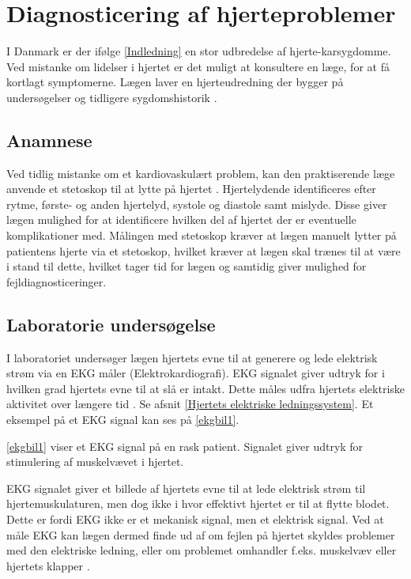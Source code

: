 \section{Diagnosticering af hjerteproblemer}

I Danmark er der ifølge \ref{Indledning}  en stor udbredelse af hjerte-karsygdomme. Ved mistanke om lidelser i hjertet er det muligt at konsultere en læge, for at få kortlagt symptomerne. Lægen laver en hjerteudredning der bygger på undersøgelser og tidligere sygdomshistorik \cite{hjerud}.

\subsection{Anamnese}
Ved tidlig mistanke om et kardiovaskulært problem, kan den praktiserende læge anvende et stetoskop til at lytte på hjertet \cite{subob}. Hjertelydende identificeres efter rytme, første- og anden hjertelyd, systole og diastole samt mislyde. Disse giver lægen mulighed for at identificere hvilken del af hjertet der er eventuelle komplikationer med. Målingen med stetoskop kræver at lægen manuelt lytter på patientens hjerte via et stetoskop, hvilket kræver at lægen skal trænes til at være i stand til dette, hvilket tager tid for lægen og samtidig giver mulighed for fejldiagnosticeringer. 

\subsection{Laboratorie undersøgelse}
I laboratoriet undersøger lægen hjertets evne til at generere og lede elektrisk strøm via en EKG måler (Elektrokardiografi). EKG signalet giver udtryk for i hvilken grad hjertets evne til at slå er intakt. Dette måles udfra hjertets elektriske aktivitet over længere tid \cite{ekg}. Se afsnit \ref{Hjertets elektriske ledningssystem}. Et eksempel på et EKG signal kan ses på \ref{ekgbil1}. 

\label{ekgbil1}
\ref{ekgbil1} viser et EKG signal på en rask patient. Signalet giver udtryk for stimulering af muskelvævet i hjertet. 

EKG signalet giver et billede af hjertets evne til at lede elektrisk strøm til hjertemuskulaturen, men dog ikke i hvor effektivt hjertet er til at flytte blodet. Dette er fordi EKG ikke er et mekanisk signal, men et elektrisk signal. Ved at måle EKG kan lægen dermed finde ud af om fejlen på hjertet skyldes problemer med den elektriske ledning, eller om problemet omhandler f.eks. muskelvæv eller hjertets klapper \cite{ekg}. 

